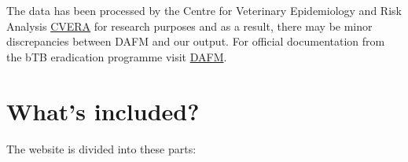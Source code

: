 \documentclass[
  letterpaper,
  DIV=11,
  numbers=noendperiod]{scrreprt}
\begin{document}
The data has been processed by the Centre for Veterinary Epidemiology
and Risk Analysis \href{https://www.ucd.ie/cvera/}{CVERA} for research
purposes and as a result, there may be minor discrepancies between DAFM
and our output. For official documentation from the bTB eradication
programme visit
\href{https://www.gov.ie/en/department-of-agriculture-food-and-the-marine/collections/bovine-tb/}{DAFM}.

\section*{What's included?}\label{whats-included}


The website is divided into these parts:
\end{document}
